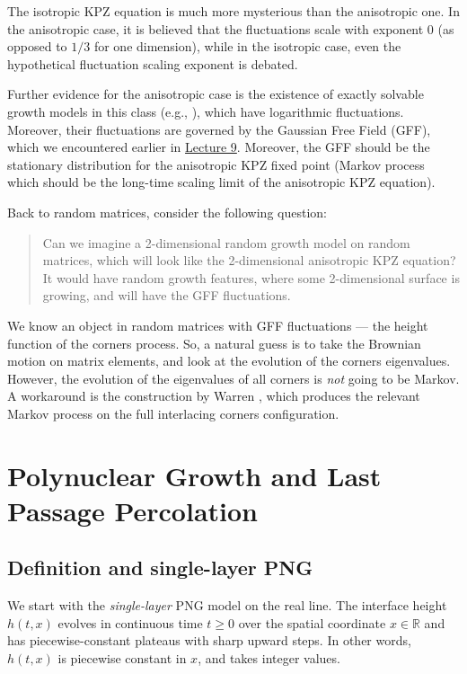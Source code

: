 \documentclass[letterpaper,11pt,oneside,reqno]{book}
\numberwithin{equation}{chapter}  %
\theoremstyle{definition}
\begin{document}
The isotropic KPZ equation is much more mysterious than the anisotropic one.
In the anisotropic case, it is believed that the
fluctuations scale with exponent $0$
(as opposed to $1/3$ for one dimension),
while in the isotropic case, even the hypothetical fluctuation scaling exponent is debated.

Further evidence for the anisotropic case is the existence of exactly
solvable growth models in this class (e.g., \cite{BorFerr2008DF}),
which have logarithmic fluctuations. Moreover, their fluctuations
are governed by the Gaussian Free Field (GFF), which we encountered earlier in
\href{https://lpetrov.cc/rmt25/rmt2025-l9.pdf}{Lecture 9}.
Moreover, the GFF should be the stationary distribution for the anisotropic
KPZ fixed point (Markov process which should be the long-time scaling limit
of the anisotropic KPZ equation).

Back to random matrices, consider the following question:
\begin{quote}
	Can we imagine a 2-dimensional random growth model
	on random matrices, which will look like the 2-dimensional anisotropic KPZ equation?
	It would have random growth features, where some 2-dimensional surface is growing,
	and will have the GFF fluctuations.
\end{quote}

We know an object in random matrices
with GFF fluctuations --- the height function of the corners process.
So, a natural guess is to take the Brownian motion on matrix elements,
and look at the evolution of the corners eigenvalues. However,
the evolution of the eigenvalues of all corners is \emph{not}
going to be Markov.
A workaround is the construction by Warren \cite{warren2005dyson},
which produces the relevant Markov process on the full
interlacing corners configuration.

\section{Polynuclear Growth and Last Passage Percolation}
\label{lecture12:sec:PNG}

\subsection{Definition and single-layer PNG}
\label{lecture12:sub:PNG-definition}
We start with the \emph{single-layer} PNG model on the real line. The interface height $h(t,x)$ evolves in continuous time $t\ge0$ over the spatial coordinate $x\in\mathbb{R}$ and has piecewise-constant plateaus with sharp upward steps.
In other words, $h(t,x)$ is piecewise constant in $x$, and takes integer values.
\end{document}
